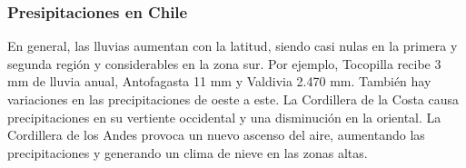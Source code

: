 \subsubsection{Presipitaciones en Chile}
En general, las lluvias aumentan con la latitud, siendo casi nulas en la primera y segunda región y considerables en la zona sur. Por ejemplo, Tocopilla recibe 3 mm de lluvia anual, Antofagasta 11 mm y Valdivia 2.470 mm. También hay variaciones en las precipitaciones de oeste a este. La Cordillera de la Costa causa precipitaciones en su vertiente occidental y una disminución en la oriental. La Cordillera de los Andes provoca un nuevo ascenso del aire, aumentando las precipitaciones y generando un clima de nieve en las zonas altas.

